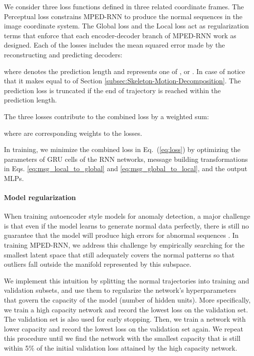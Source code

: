 We consider three loss functions defined in three related coordinate
frames. The Perceptual loss  constrains MPED-RNN to produce
the normal sequences in the image coordinate system. The Global loss
 and the Local loss  act as regularization terms that
enforce that each encoder-decoder branch of MPED-RNN work as designed.
Each of the losses includes the mean squared error made by the reconstructing
and predicting decoders:

where  denotes the prediction length and  represents one of
,  or . In case of  notice that it makes 
equal to  of Section \ref{subsec:Skeleton-Motion-Decomposition}.
The prediction loss is truncated if the end of trajectory is reached
within the prediction length.

The three losses contribute to the combined loss by a weighted sum:

where 
are corresponding weights to the losses. 

In training, we minimize the combined loss in Eq.~(\ref{eq:loss})
by optimizing the parameters of GRU cells of the RNN networks, message
building transformations in Eqs. \ref{eq:msg_local_to_global} and
\ref{eq:msg_global_to_local}, and the output MLPs. 

\paragraph*{Model regularization}

When training autoencoder style models for anomaly detection, a major
challenge is that even if the model learns to generate normal data
perfectly, there is still no guarantee that the model will produce
high errors for abnormal sequences \cite{liu2018anopred}. In training
MPED-RNN, we address this challenge by empirically searching for the
smallest latent space that still adequately covers the normal patterns
so that outliers fall outside the manifold represented by this subspace.

We implement this intuition by splitting the normal trajectories into
training and validation subsets, and use them to regularize the network's
hyperparameters that govern the capacity of the model (\eg number
of hidden units). More specifically, we train a high capacity network
and record the lowest loss on the validation set. The validation set
is also used for early stopping. Then, we train a network with lower
capacity and record the lowest loss on the validation set again. We
repeat this procedure until we find the network with the smallest
capacity that is still within 5\% of the initial validation loss attained
by the high capacity network.

